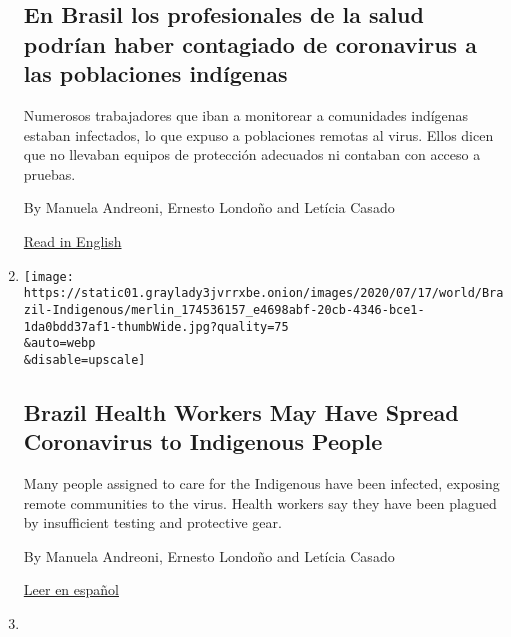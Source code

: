 \begin{enumerate}
  \hypertarget{en-brasil-los-profesionales-de-la-salud-podruxedan-haber-contagiado-de-coronavirus-a-las-poblaciones-induxedgenas}{%
  \subsection{En Brasil los profesionales de la salud podrían haber
  contagiado de coronavirus a las poblaciones
  indígenas}\label{en-brasil-los-profesionales-de-la-salud-podruxedan-haber-contagiado-de-coronavirus-a-las-poblaciones-induxedgenas}}

  Numerosos trabajadores que iban a monitorear a comunidades indígenas
  estaban infectados, lo que expuso a poblaciones remotas al virus.
  Ellos dicen que no llevaban equipos de protección adecuados ni
  contaban con acceso a pruebas.

  By Manuela Andreoni, Ernesto Londoño and Letícia Casado

  \href{https://www.nytimes3xbfgragh.onion/2020/07/19/world/americas/coronavirus-brazil-indigenous.html}{Read
  in English}
\item
  \href{/2020/07/19/world/americas/coronavirus-brazil-indigenous.html}{}

  \texttt{[image: https://static01.graylady3jvrrxbe.onion/images/2020/07/17/world/Brazil-Indigenous/merlin\_174536157\_e4698abf-20cb-4346-bce1-1da0bdd37af1-thumbWide.jpg?quality=75\\\&auto=webp\\\&disable=upscale]}

  \hypertarget{brazil-health-workers-may-have-spread-coronavirus-to-indigenous-people}{%
  \subsection{Brazil Health Workers May Have Spread Coronavirus to
  Indigenous
  People}\label{brazil-health-workers-may-have-spread-coronavirus-to-indigenous-people}}

  Many people assigned to care for the Indigenous have been infected,
  exposing remote communities to the virus. Health workers say they have
  been plagued by insufficient testing and protective gear.

  By Manuela Andreoni, Ernesto Londoño and Letícia Casado

  \href{https://www.nytimes3xbfgragh.onion/es/2020/07/20/espanol/america-latina/brasil-coronavirus-comunidades-indigenas.html}{Leer
  en español}
\item
  \href{/2020/07/08/world/americas/brazil-bolsonaro-covid-coronavirus.html}{}


\end{enumerate}
